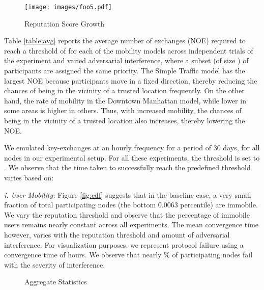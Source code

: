 \documentclass[letterpaper,twocolumn]{sig-alternate}
\begin{document}
\begin{figure}[!h]
  \begin{center}
      \texttt{[image: images/foo5.pdf]}
    \end{center}
\vspace{-0.1in}
  \caption{\small{Reputation Score Growth}}
  \label{fig:RSG}
 \vspace{-0.1in}
\end{figure}


\vspace{1mm}
 Table \ref{table:avg} reports the average number of exchanges (NOE) required to reach a threshold of  for each of the mobility models across  independent trials of the experiment and varied adversarial interference, where a subset (of size ) of participants are assigned the same priority. The Simple Traffic model has the largest NOE because participants move in a fixed direction, thereby reducing the chances of being in the vicinity of a trusted location frequently. On the other hand, the rate of mobility in the Downtown Manhattan model, while lower in some areas is higher in others. Thus, with increased mobility, the chances of being in the vicinity of a trusted location also increases, thereby lowering the NOE. 

\vspace{1mm}
 We emulated key-exchanges at an hourly frequency for a period of 30 days, for all  nodes in our experimental setup. For all these experiments, the threshold is set to . We observe that the time taken to successfully reach the predefined threshold varies based on: 


\vspace{1mm}
{\em i. User Mobility:} Figure \ref{fig:cdf} suggests that in the baseline case, a very small fraction of total participating nodes (the bottom 0.0063 percentile) are immobile. We vary the reputation threshold and observe that the percentage of immobile users remains nearly constant across all experiments. The mean convergence time however, varies with the reputation threshold and amount of adversarial interference. For visualization purposes, we represent protocol failure using a convergence time of  hours. We observe that nearly \% of participating nodes fail with the severity of interference.

\begin{figure*}
\centering
{}

\caption{Aggregate Statistics}
\end{figure*}
\end{document}
